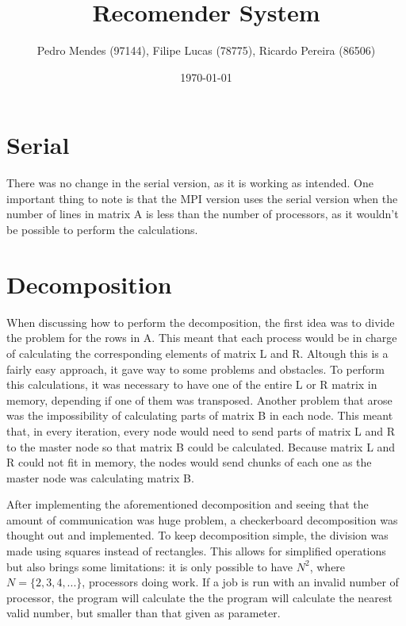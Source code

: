 \documentclass[a4paper]{article}
\begin{document}
\title{Recomender System}
\author{Pedro Mendes (97144), Filipe Lucas (78775), Ricardo Pereira (86506)}
\date{\today}
\maketitle


\section{Serial} %
There was no change in the serial version, as it is working as intended. One important 
thing to note is that the MPI version uses the serial version when the number of lines
in matrix A is less than the number of processors, as it wouldn't be possible to perform
the calculations. %

\section{Decomposition}
When discussing how to perform the decomposition, the first idea was to divide the problem 
for the rows in A. This meant that each process would be in charge of calculating the
corresponding elements of matrix L and R. Altough this is a fairly easy
approach, it gave way to some problems and obstacles. To perform this calculations,
it was necessary to have one of the entire L or R matrix in memory, depending if one
of them was transposed. %
Another problem that arose was the impossibility of calculating parts of matrix B in
each node. This meant that, in every iteration, every node would need to send parts of
matrix L and R to the master node so that matrix B could be calculated. Because 
matrix L and R could not fit in memory, the nodes would send chunks of each one as
the master node was calculating matrix B. 

After implementing the aforementioned decomposition and seeing that the amount of
communication was huge problem, a checkerboard decomposition was thought out and 
implemented. To keep decomposition simple, the division was made using squares
instead of rectangles. This allows for simplified operations %
but also brings some limitations: it is only possible to have $N^{2}$, where 
$N = \{2, 3, 4, ...\}$, processors doing work. If a job is run with an invalid number
of processor, the program will calculate the the program will calculate the nearest 
valid number, but smaller than that given as parameter.
\end{document}
